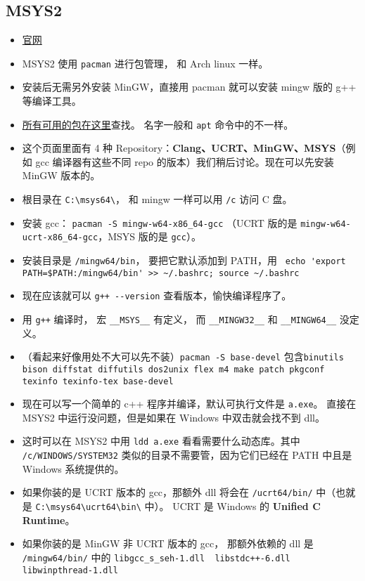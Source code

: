 \subsection{MSYS2}
\begin{itemize}
\item \href{https://www.msys2.org/}{官网}
\item MSYS2 使用 \verb`pacman` 进行包管理， 和 Arch linux 一样。
\item 安装后无需另外安装 MinGW，直接用 pacman 就可以安装 mingw 版的 g++ 等编译工具。
\item \href{https://packages.msys2.org/queue}{所有可用的包在这里}查找。 名字一般和 \verb`apt` 命令中的不一样。
\item 这个页面里面有 4 种 Repository：\textbf{Clang、UCRT、MinGW、MSYS}（例如 gcc 编译器有这些不同 repo 的版本）我们稍后讨论。现在可以先安装 MinGW 版本的。
\item 根目录在 \verb`C:\msys64\`， 和 mingw 一样可以用 \verb`/c` 访问 C 盘。
\item 安装 gcc： \verb`pacman -S mingw-w64-x86_64-gcc` （UCRT 版的是 \verb`mingw-w64-ucrt-x86_64-gcc`，MSYS 版的是 \verb`gcc`）。
\item 安装目录是 \verb`/mingw64/bin`， 要把它默认添加到 PATH，用 \verb` echo 'export PATH=$PATH:/mingw64/bin' >> ~/.bashrc; source ~/.bashrc`
\item 现在应该就可以 \verb`g++ --version` 查看版本，愉快编译程序了。
\item 用 \verb`g++` 编译时， 宏 \verb`__MSYS__` 有定义， 而 \verb`__MINGW32__` 和 \verb`__MINGW64__` 没定义。
\item （看起来好像用处不大可以先不装）\verb`pacman -S base-devel` 包含\verb`binutils bison diffstat diffutils dos2unix flex m4 make patch pkgconf texinfo texinfo-tex base-devel`
\item 现在可以写一个简单的 c++ 程序并编译，默认可执行文件是 \verb`a.exe`。 直接在 MSYS2 中运行没问题，但是如果在 Windows 中双击就会找不到 dll。
\item 这时可以在 MSYS2 中用 \verb`ldd a.exe` 看看需要什么动态库。其中 \verb`/c/WINDOWS/SYSTEM32` 类似的目录不需要管，因为它们已经在 PATH 中且是 Windows 系统提供的。
\item 如果你装的是 UCRT 版本的 gcc，那额外 dll 将会在 \verb`/ucrt64/bin/` 中（也就是 \verb`C:\msys64\ucrt64\bin\` 中）。 UCRT 是 Windows 的 \textbf{Unified C Runtime}。
\item 如果你装的是 MinGW 非 UCRT 版本的 gcc， 那额外依赖的 dll 是 \verb`/mingw64/bin/` 中的 \verb`libgcc_s_seh-1.dll  libstdc++-6.dll  libwinpthread-1.dll`

\end{itemize}
